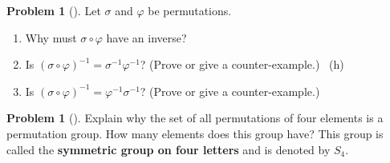 \documentclass[10pt,]{book}
\newcommand{\terminology}[1]{\textbf{#1}}
\theoremstyle{plain}
\theoremstyle{definition}
\newtheorem{activity}[project]{Problem}
\theoremstyle{definition}
\numberwithin{equation}{chapter}
\begin{document}
\begin{activity}[]\marginsymbol[-1em]{} \label{activity-256}
\hypertarget{p-1487}{}%
Let \(\sigma\) and \(\varphi\) be permutations.%
\begin{enumerate}[font=\bfseries,label=(\alph*),ref=\alph*]
\item\label{task-190} \marginsymbol[-2.5em]{} \hypertarget{p-1488}{}%
Why must \(\sigma\circ\varphi\) have an inverse?%
\item\label{task-191} \marginsymbol[-2.5em]{} \hypertarget{p-1490}{}%
Is \((\sigma\circ\varphi)^{-1}=\sigma^{-1}\varphi^{-1}\)? (Prove or give a counter-example.)%
~{\tiny (h)}\item\label{task-192} \marginsymbol[-2.5em]{} \hypertarget{p-1493}{}%
Is \((\sigma\circ\varphi)^{-1}= \varphi^{-1}\sigma^{-1}\)? (Prove or give a counter-example.)%
\end{enumerate}
\end{activity}
\begin{activity}[] \label{activity-257}
\hypertarget{p-1495}{}%
Explain why the set of all permutations of four elements is a permutation group. How many elements does this group have? This group is called the \terminology{symmetric group on four letters} and is denoted by \(S_4\).%
\end{activity}
\typeout{************************************************}
\typeout{************************************************}
\end{document}
